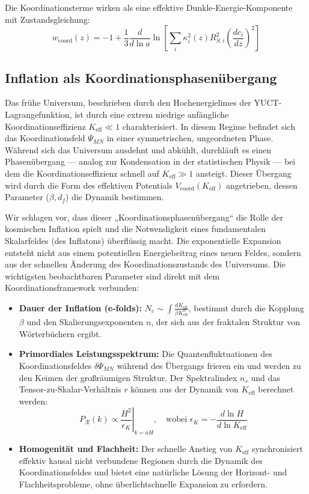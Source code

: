 \documentclass[11pt,a4paper]{article}
\begin{document}
	Die Koordinationsterme wirken als eine effektive Dunkle-Energie-Komponente mit Zustandsgleichung:
	\begin{equation}
		w_{\text{coord}}(z) = -1 + \frac{1}{3} \frac{d}{d\ln a} \ln \left[ \sum_i \kappa_i^2(z) R_{S,i}^2 \left(\frac{dc_i}{dz}\right)^2 \right]
	\end{equation}
	
	
	\subsection{Inflation als Koordinationsphasenübergang}
	\label{subsec:inflation-transition}
	
	Das frühe Universum, beschrieben durch den Hochenergielimes der YUCT-Lagrangefunktion, ist durch eine extrem niedrige anfängliche Koordinationseffizienz $K_{\mathrm{eff}} \ll 1$ charakterisiert. In diesem Regime befindet sich das Koordinationsfeld $\Psi_{MN}$ in einer symmetrischen, ungeordneten Phase. Während sich das Universum ausdehnt und abkühlt, durchläuft es einen Phasenübergang — analog zur Kondensation in der statistischen Physik — bei dem die Koordinationseffizienz schnell auf $K_{\mathrm{eff}} \gg 1$ ansteigt. Dieser Übergang wird durch die Form des effektiven Potentials $V_{\mathrm{coord}}(K_{\mathrm{eff}})$ angetrieben, dessen Parameter ($\beta, d_f$) die Dynamik bestimmen.
	
	Wir schlagen vor, dass dieser „Koordinationsphasenübergang“ die Rolle der kosmischen Inflation spielt und die Notwendigkeit eines fundamentalen Skalarfeldes (des Inflatons) überflüssig macht. Die exponentielle Expansion entsteht nicht aus einem potentiellen Energiebeitrag eines neuen Feldes, sondern aus der schnellen Änderung des Koordinationszustands des Universums. Die wichtigsten beobachtbaren Parameter sind direkt mit dem Koordinationsframework verbunden:
	
	\begin{itemize}
		\item \textbf{Dauer der Inflation (e-folds):} $N_e \sim \int \frac{dK_{\mathrm{eff}}}{\beta K_{\mathrm{eff}}^n} $, bestimmt durch die Kopplung $\beta$ und den Skalierungsexponenten $n$, der sich aus der fraktalen Struktur von Wörterbüchern ergibt.
		\item \textbf{Primordiales Leistungsspektrum:} Die Quantenfluktuationen des Koordinationsfeldes $\delta \Psi_{MN}$ während des Übergangs frieren ein und werden zu den Keimen der großräumigen Struktur. Der Spektralindex $n_s$ und das Tensor-zu-Skalar-Verhältnis $r$ können aus der Dynamik von $K_{\mathrm{eff}}$ berechnet werden:
		\begin{equation}
			P_{\mathcal{R}}(k) \propto \left. \frac{H^2}{\epsilon_K} \right|_{k=aH}, \quad \text{wobei } \epsilon_K = -\frac{d\ln H}{d\ln K_{\mathrm{eff}}}
		\end{equation}
		\item \textbf{Homogenität und Flachheit:} Der schnelle Anstieg von $K_{\mathrm{eff}}$ synchronisiert effektiv kausal nicht verbundene Regionen durch die Dynamik des Koordinationsfeldes und bietet eine natürliche Lösung der Horizont- und Flachheitsprobleme, ohne überlichtschnelle Expansion zu erfordern.
	\end{itemize}
	
\end{document}
